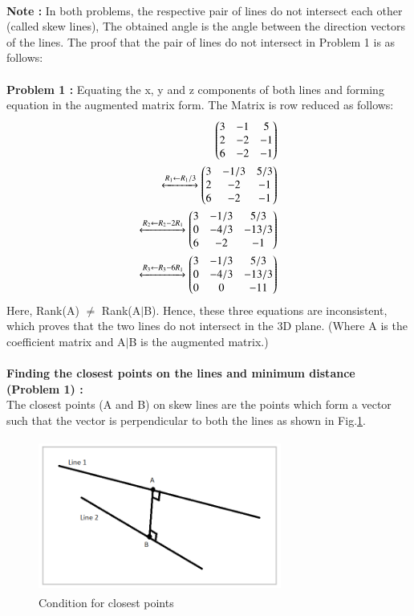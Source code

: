 \documentclass[journal,12pt,twocolumn]{IEEEtran}
\begin{document}
\\
\textbf{Note :} In both problems, the respective pair of lines do not intersect each other (called skew lines), The obtained angle is the angle between the direction vectors of the lines. The proof that the pair of lines do not intersect in Problem 1 is as follows:\\
\\
\textbf{Problem 1 :} Equating the x, y and z components of both lines and forming equation in the augmented matrix form. The Matrix is row reduced as follows:
\begin{align}
\begin{pmatrix}3 & -1 & 5\\2 & -2 & -1\\6 &-2&-1\end{pmatrix}\\
\xleftrightarrow[]{R_1\leftarrow R_1/3}
\begin{pmatrix}3 & -1/3 & 5/3 \\2 & -2 & -1\\6 &-2&-1\end{pmatrix}\\
\xleftrightarrow[]{R_2\leftarrow R_2-2R_1}   
\begin{pmatrix}3 & -1/3 & 5/3\\0 & -4/3 & -13/3\\6 &-2&-1\end{pmatrix}\\
\xleftrightarrow[]{R_3\leftarrow R_3-6R_1}
\begin{pmatrix}3 & -1/3 & 5/3\\0 & -4/3 & -13/3\\0 &0&-11\end{pmatrix}
\end{align} 
Here, Rank(A) $\neq$ Rank(A$\mid$B). Hence, these three equations are inconsistent, which proves that the two lines do not intersect in the 3D plane. (Where A is the coefficient matrix and A$\mid$B is the augmented matrix.) \\
\\
\textbf{Finding the closest points on the lines and minimum distance (Problem 1) :}\\
The closest points (A and B) on skew lines are the points which form a vector such that the vector is perpendicular to both the lines as shown in Fig.\ref{Fig1}.
\\
\begin{figure}[h!]
\centering
\includegraphics[width=8cm, height=5cm]{Figure_3}
\caption{Condition for closest points}
\label{Fig1}
\end{figure}
\end{document}
